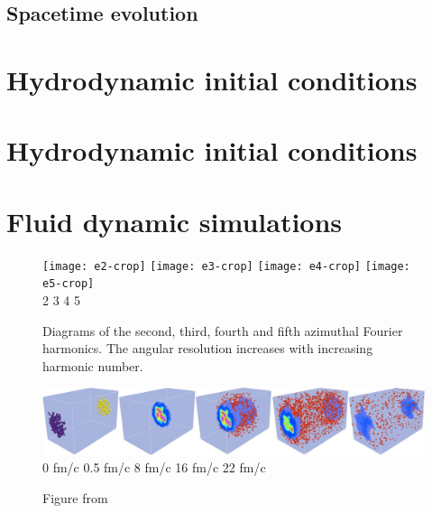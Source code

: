 \documentclass[aps,prc,reprint,amsmath,nofootinbib]{revtex4-1}
\begin{document}
\subsection{Spacetime evolution}

\section{Hydrodynamic initial conditions}

\section{Hydrodynamic initial conditions}

\section{Fluid dynamic simulations}

\begin{figure}
 \texttt{[image: e2-crop]} \hspace{.01\columnwidth} 
 \texttt{[image: e3-crop]} \hspace{.01\columnwidth}
 \texttt{[image: e4-crop]} \hspace{.01\columnwidth}
 \texttt{[image: e5-crop]}\\
 \flushleft
 \vspace{-0.1in}
 \hspace{0.08\columnwidth} 2 \hspace{0.19\columnwidth} 3 \hspace{0.21\columnwidth} 4 \hspace{0.22\columnwidth} 5
 \caption{Diagrams of the second, third, fourth and fifth azimuthal Fourier harmonics. The angular resolution increases with increasing harmonic number.}
\end{figure}

\begin{figure}[t]
  \centering
  \includegraphics[width=\textwidth]{evolution} \\
  0 fm/c   \hspace{.13\textwidth}
  0.5 fm/c \hspace{.13\textwidth}
  8 fm/c   \hspace{.13\textwidth}
  16 fm/c  \hspace{.13\textwidth}
  22 fm/c
  \caption{Figure from \cite{iss}}
  \label{fig:coll}
\end{figure}
\end{document}
